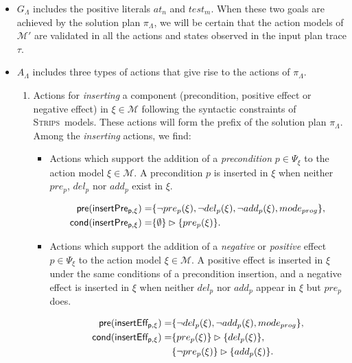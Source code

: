 \documentclass[runningheads]{llncs}
\newcommand{\pre}{\mathsf{pre}}     %
\newcommand{\cond}{\mathsf{cond}}   %
\newcommand{\strips}{\textsc{Strips}}     %
\begin{document}
\begin{itemize}
\item $G_{\Lambda}$ includes the positive literals $at_n$ and $test_m$. When these two goals are achieved by the solution plan $\pi_\Lambda$, we will be certain that the action models of $\mathcal{M'}$ are validated in all the actions and states observed in the input plan trace $\tau$.

\item $A_{\Lambda}$ includes three types of actions that give rise to the actions of $\pi_\Lambda$.
\begin{enumerate}
\item Actions for {\em inserting} a component (precondition, positive effect or negative effect) in $\xi \in \mathcal{M}$ following the syntactic constraints of \strips\ models. These actions will form the prefix of the solution plan $\pi_\Lambda$. Among the \emph{inserting} actions, we find:
\begin{itemize}
\item Actions which support the addition of a {\em precondition} $p\in \Psi_{\xi}$ to the action model $\xi\in\mathcal{M}$. A precondition $p$ is inserted in $\xi$ when neither $pre_p$, $del_p$ nor $add_p$ exist in $\xi$.

\begin{small}
\begin{align*}
\hspace*{7pt}\pre(\mathsf{insertPre_{p,\xi}})=&\{\neg pre_{p}(\xi), \neg del_{p}(\xi),\neg add_{p}(\xi), mode_{prog}\},\\
\cond(\mathsf{insertPre_{p,\xi}})=&\{\emptyset\}\rhd\{pre_{p}(\xi)\}.
\end{align*}
\end{small}

\item Actions which support the addition of a {\em negative} or {\em positive} effect $p\in \Psi_{\xi}$ to the action model $\xi\in\mathcal{M}$. A positive effect is inserted in $\xi$ under the same conditions of a precondition insertion, and a negative effect is inserted in $\xi$ when neither $del_p$ nor $add_p$ appear in $\xi$ but $pre_p$ does.

\begin{small}
\begin{align*}
\hspace*{7pt}\pre(\mathsf{insertEff_{p,\xi}})=&\{\neg del_{p}(\xi),\neg add_{p}(\xi), mode_{prog}\},\\
\cond(\mathsf{insertEff_{p,\xi}})=&\{pre_{p}(\xi)\}\rhd\{del_{p}(\xi)\},\\
& \{\neg pre_{p}(\xi)\}\rhd\{add_{p}(\xi)\}.
\end{align*}
\end{small}
\end{itemize}


\end{enumerate}
\end{itemize}
\end{document}
